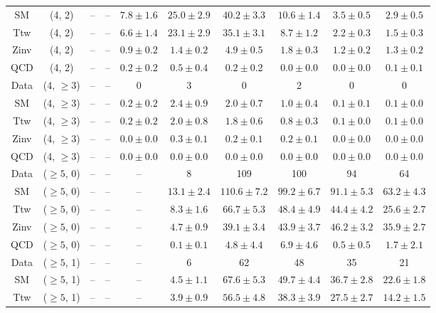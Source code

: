 \begin{table}[h!]
{\begin{tabular}{cccccccccc}
	SM & (4, 2) & -- & -- & $7.8\pm 1.6$ & $25.0\pm 2.9$ & $40.2\pm 3.3$ & $10.6\pm 1.4$ & $3.5\pm 0.5$ & $2.9\pm 0.5$ \\[0.5ex] 
	Ttw & (4, 2) & -- & -- & $6.6\pm 1.4$ & $23.1\pm 2.9$ & $35.1\pm 3.1$ & $8.7\pm 1.2$ & $2.2\pm 0.3$ & $1.5\pm 0.3$ \\[0.5ex] 
	Zinv & (4, 2) & -- & -- & $0.9\pm 0.2$ & $1.4\pm 0.2$ & $4.9\pm 0.5$ & $1.8\pm 0.3$ & $1.2\pm 0.2$ & $1.3\pm 0.2$ \\[0.5ex] 
	QCD & (4, 2) & -- & -- & $0.2\pm 0.2$ & $0.5\pm 0.4$ & $0.2\pm 0.2$ & $0.0\pm 0.0$ & $0.0\pm 0.0$ & $0.1\pm 0.1$ \\[0.5ex] 
	Data & (4, $\ge3$) & -- & -- & 0 & 3 & 0 & 2 & 0 & 0 \\[0.5ex] 
	SM & (4, $\ge3$) & -- & -- & $0.2\pm 0.2$ & $2.4\pm 0.9$ & $2.0\pm 0.7$ & $1.0\pm 0.4$ & $0.1\pm 0.1$ & $0.1\pm 0.0$ \\[0.5ex] 
	Ttw & (4, $\ge3$) & -- & -- & $0.2\pm 0.2$ & $2.0\pm 0.8$ & $1.8\pm 0.6$ & $0.8\pm 0.3$ & $0.1\pm 0.0$ & $0.1\pm 0.0$ \\[0.5ex] 
	Zinv & (4, $\ge3$) & -- & -- & $0.0\pm 0.0$ & $0.3\pm 0.1$ & $0.2\pm 0.1$ & $0.2\pm 0.1$ & $0.0\pm 0.0$ & $0.0\pm 0.0$ \\[0.5ex] 
	QCD & (4, $\ge3$) & -- & -- & $0.0\pm 0.0$ & $0.0\pm 0.0$ & $0.0\pm 0.0$ & $0.0\pm 0.0$ & $0.0\pm 0.0$ & $0.0\pm 0.0$ \\[0.5ex] 
	Data & ($\ge5$, 0) & -- & -- & -- & 8 & 109 & 100 & 94 & 64 \\[0.5ex] 
	SM & ($\ge5$, 0) & -- & -- & -- & $13.1\pm 2.4$ & $110.6\pm 7.2$ & $99.2\pm 6.7$ & $91.1\pm 5.3$ & $63.2\pm 4.3$ \\[0.5ex] 
	Ttw & ($\ge5$, 0) & -- & -- & -- & $8.3\pm 1.6$ & $66.7\pm 5.3$ & $48.4\pm 4.9$ & $44.4\pm 4.2$ & $25.6\pm 2.7$ \\[0.5ex] 
	Zinv & ($\ge5$, 0) & -- & -- & -- & $4.7\pm 0.9$ & $39.1\pm 3.4$ & $43.9\pm 3.7$ & $46.2\pm 3.2$ & $35.9\pm 2.7$ \\[0.5ex] 
	QCD & ($\ge5$, 0) & -- & -- & -- & $0.1\pm 0.1$ & $4.8\pm 4.4$ & $6.9\pm 4.6$ & $0.5\pm 0.5$ & $1.7\pm 2.1$ \\[0.5ex] 
	Data & ($\ge5$, 1) & -- & -- & -- & 6 & 62 & 48 & 35 & 21 \\[0.5ex] 
	SM & ($\ge5$, 1) & -- & -- & -- & $4.5\pm 1.1$ & $67.6\pm 5.3$ & $49.7\pm 4.4$ & $36.7\pm 2.8$ & $22.6\pm 1.8$ \\[0.5ex] 
	Ttw & ($\ge5$, 1) & -- & -- & -- & $3.9\pm 0.9$ & $56.5\pm 4.8$ & $38.3\pm 3.9$ & $27.5\pm 2.7$ & $14.2\pm 1.5$ \\[0.5ex] 

\end{tabular}}
\end{table}
